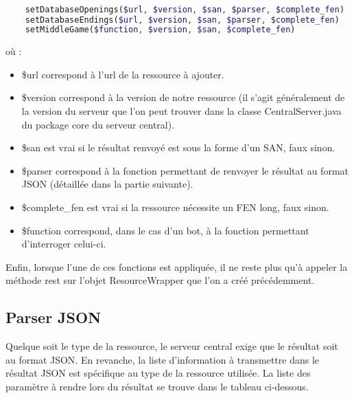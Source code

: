 \documentclass[a4paper,11pt]{article}
\begin{document}
\lstset{xleftmargin =-2.2cm}
\begin{lstlisting}[language=php]

	setDatabaseOpenings($url, $version, $san, $parser, $complete_fen)
	setDatabaseEndings($url, $version, $san, $parser, $complete_fen)
	setMiddleGame($function, $version, $san, $complete_fen)
\end{lstlisting}
	
où :

\begin{itemize}
	\item \$url correspond à l'url de la ressource à ajouter.
	\item \$version correspond à la version de notre ressource (il s'agit généralement de la version du serveur que l'on peut trouver dans la classe CentralServer.java du package core du serveur central).
	\item \$san est vrai si le résultat renvoyé est sous la forme d'un SAN, faux sinon.
	\item \$parser correspond à la fonction permettant de renvoyer le résultat au format JSON (détaillée dans la partie suivante).
	\item \$complete\_fen est vrai si la ressource nécessite un FEN long, faux sinon.
	\item \$function correspond, dans le cas d'un bot, à la fonction permettant d'interroger celui-ci. 
\end{itemize}
Enfin, lorsque l'une de ces fonctions est appliquée, il ne reste plus qu'à appeler la méthode rest sur l'objet ResourceWrapper que l'on a créé précédemment.
	
\subsection{Parser JSON}
Quelque soit le type de la ressource, le serveur central exige que le résultat soit au format JSON. En revanche, la liste d'information à transmettre dans le résultat JSON est spécifique au type de la ressource utilisée. La liste des paramètre à rendre lors du résultat se trouve dans le tableau ci-dessous.
\end{document}
